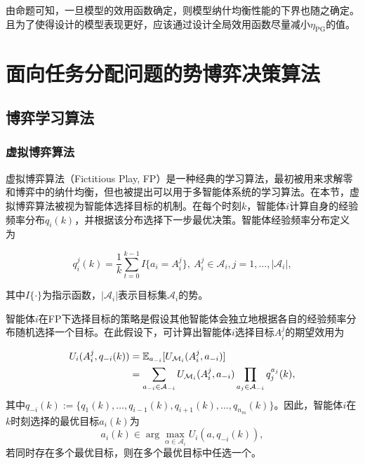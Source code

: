 由命题可知，一旦模型的效用函数确定，则模型纳什均衡性能的下界也随之确定。且为了使得设计的模型表现更好，应该通过设计全局效用函数尽量减小$\eta_{\text{PG}}$的值。

\section{面向任务分配问题的势博弈决策算法}
\label{pg:pgta}
\subsection{博弈学习算法}
\label{pg:pgta:protocal}

\subsubsection{虚拟博弈算法}
\label{pgta:protocal:FP}
虚拟博弈算法（Fictitious Play, FP）是一种经典的学习算法，最初被用来求解零和博弈中的纳什均衡，但也被提出可以用于多智能体系统的学习算法。在本节，虚拟博弈算法被视为智能体选择目标的机制。在每个时刻$k$，智能体$i$计算自身的经验频率分布$q_i(k)$，并根据该分布选择下一步最优决策。智能体经验频率分布定义为

\begin{equation}
\label{pg:eq:frequency}
	q_i^j(k) = \frac{1}{k} \sum_{t=0}^{k-1} I\{a_i = A_i^j\},\ A_i^j \in \mathcal{A}_i, j = 1,\dots,|\mathcal{A}_i|,
\end{equation}

其中$I\{\cdot\}$为指示函数，$|\mathcal{A}_i|$表示目标集$\mathcal{A}_i$的势。

智能体$i$在FP下选择目标的策略是假设其他智能体会独立地根据各自的经验频率分布随机选择一个目标。在此假设下，可计算出智能体$i$选择目标$A_i^j$的期望效用为

\begin{align}
\label{pg:eq:expectU}
	U_i(A_i^j, q_{-i}(k)) &= \mathbb{E}_{a_{-i}}[U_{\mathcal{M}_i}(A_i^j,a_{-i})]\notag\\
	&= \sum_{a_{-i}\in \mathcal{A}_{-i}} U_{\mathcal{M}_i}(A_i^j, a_{-i}) \prod_{a_j \in \mathcal{A}_{-i}} q_j^{a_j}(k),
\end{align}
其中$q_{-i}(k):=\{q_1(k),\dots,q_{i-1}(k),q_{i+1}(k),\dots,q_{n_m}(k)\}$。因此，智能体$i$在$k$时刻选择的最优目标$a_i(k)$为
\begin{equation}
\label{pg:eq:bestResponse}
	a_i(k) \in \arg \max_{\alpha \in \mathcal{A}_i} U_i(a, q_{-i}(k)),
\end{equation}
若同时存在多个最优目标，则在多个最优目标中任选一个。

